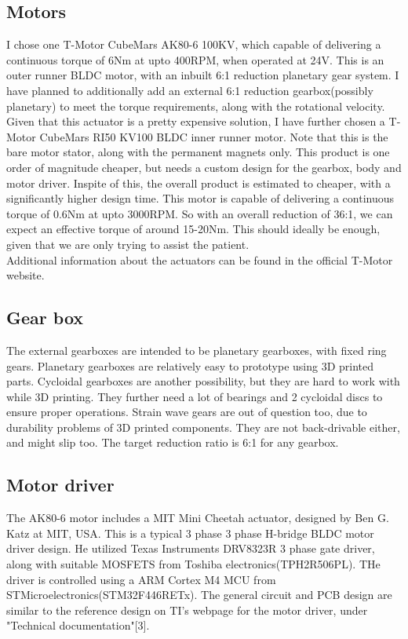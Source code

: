 \documentclass[a4paper]{article}
\begin{document}
		\subsection{Motors}
			I chose one T-Motor CubeMars AK80-6 100KV, which capable of delivering a continuous torque of 6Nm at upto 400RPM, when operated at 24V. This is an outer runner BLDC motor, with an inbuilt 6:1 reduction planetary gear system. I have planned to additionally add an external 6:1 reduction gearbox(possibly planetary) to meet the torque requirements, along with the rotational velocity.\\

			Given that this actuator is a pretty expensive solution, I have further chosen a T-Motor CubeMars RI50 KV100 BLDC inner runner motor. Note that this is the bare motor stator, along with the permanent magnets only. This product is one order of magnitude cheaper, but needs a custom design for the gearbox, body and motor driver. Inspite of this, the overall product is estimated to cheaper, with a significantly higher design time. This motor is capable of delivering a continuous torque of 0.6Nm at upto 3000RPM. So with an overall reduction of 36:1, we can expect an effective torque of around 15-20Nm. This should ideally be enough, given that we are only trying to assist the patient.\\

			Additional information about the actuators can be found in the official T-Motor website.

		\subsection{Gear box}
			The external gearboxes are intended to be planetary gearboxes, with fixed ring gears. Planetary gearboxes are relatively easy to prototype using 3D printed parts. Cycloidal gearboxes are another possibility, but they are hard to work with while 3D printing. They further need a lot of bearings and 2 cycloidal discs to ensure proper operations. Strain wave gears are out of question too, due to durability problems of 3D printed components. They are not back-drivable either, and might slip too. The target reduction ratio is 6:1 for any gearbox.

		\subsection{Motor driver}
			The AK80-6 motor includes a MIT Mini Cheetah actuator, designed by Ben G. Katz at MIT, USA. This is a typical 3 phase 3 phase H-bridge BLDC motor driver design. He utilized Texas Instruments DRV8323R 3 phase gate driver, along with suitable MOSFETS from Toshiba electronics(TPH2R506PL). THe driver is controlled using a ARM Cortex M4 MCU from STMicroelectronics(STM32F446RETx). The general circuit and PCB design are similar to the reference design on TI's webpage for the motor driver, under "Technical documentation"[3].\\
\end{document}
